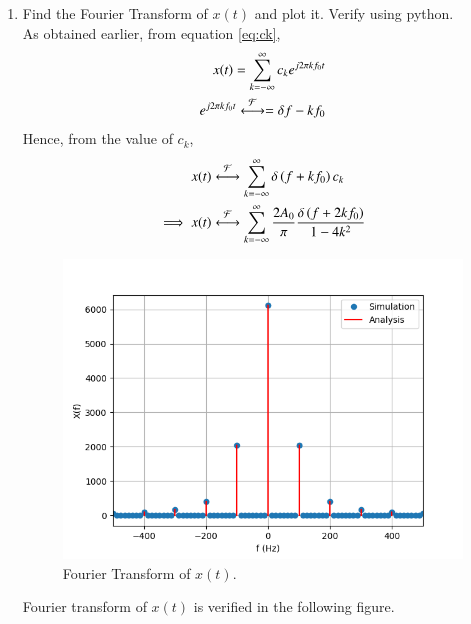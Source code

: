 \documentclass[journal,12pt,twocolumn]{IEEEtran}
\renewcommand\thesection{\arabic{section}}
\begin{document}
\begin{enumerate}[label=\thesection.\arabic*
		,ref=\thesection.\theenumi]
\begin{align}
			&=\frac{1}{2}\brak{\delta\brak{f-f_0} + \delta\brak{f+f_0}}
		\end{align}
		\item Find the Fourier Transform of $x(t)$ and plot it. Verify using python.\\
		\solution As obtained earlier, from equation \eqref{eq:ck},
		\begin{align}
			x(t)=\sum_{k=-\infty}^{\infty}c_k e^{j2\pi k f_0 t}\\
			e^{j 2 \pi k f_0 t}\overset{\mathcal{F}}{ \longleftrightarrow}=\delta{f-kf_0}
		\end{align}
		Hence, from the value of $c_k$,
		\begin{align}
			x(t)&\overset{\mathcal{F}}{ \longleftrightarrow}\sum_{k=-\infty}^{\infty} \delta\left(f+kf_0\right) c_k\\
			\implies x(t)&\overset{\mathcal{F}}{ \longleftrightarrow}\sum_{k=-\infty}^{\infty} \frac{2A_0}{\pi} \frac{\delta\left(f+2kf_0\right)}{1-4k^2} 
		\end{align} 
		\begin{figure}[!ht]
			\includegraphics[width=\columnwidth]{figs/3_8.png}
			\caption{Fourier Transform of $x(t)$.}
			\label{fig:fourier-xt}
		\end{figure}
		Fourier transform of $x(t)$ is verified in the following figure. 

\end{enumerate}
\end{document}
